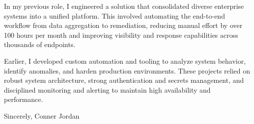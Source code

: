 \documentclass[letterpaper,11pt]{article}
\begin{document}
In my previous role, I engineered a solution that consolidated diverse enterprise systems into a unified platform. This involved automating the end-to-end workflow from data aggregation to remediation, reducing manual effort by over 100 hours per month and improving visibility and response capabilities across thousands of endpoints.

\vspace{16pt}

Earlier, I developed custom automation and tooling to analyze system behavior, identify anomalies, and harden production environments. These projects relied on robust system architecture, strong authentication and secrets management, and disciplined monitoring and alerting to maintain high availability and performance.

\vspace{16pt}

Sincerely,  
Conner Jordan
\end{document}
